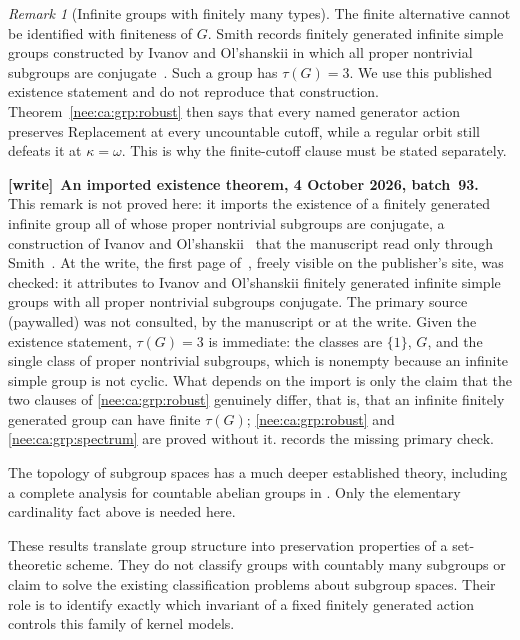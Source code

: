 \documentclass[11pt,letterpaper]{article}
\numberwithin{equation}{section}
\theoremstyle{plain}
\theoremstyle{definition}
\theoremstyle{remark}
\newtheorem{remark}[remark]{Remark}
\newenvironment{writenote}[1][]{\par\smallskip\begingroup\small\raggedright
 \setlength{\parindent}{1.25em}\noindent\textbf{[write]}\if\relax\detokenize{#1}\relax\else~\textbf{#1.}\fi\ }%
 {\par\endgroup\smallskip}
\begin{document}
\begin{remark}[Infinite groups with finitely many types]\label{nee:ca:grp:exception}
The finite alternative cannot be identified with finiteness of $G$.
Smith records finitely generated infinite simple groups constructed by
Ivanov and Ol'shanskii in which all proper nontrivial subgroups are
conjugate~\cite[p.~69]{Smith1995}.  Such a group has $\tau(G)=3$.
We use this published existence statement and do not reproduce that
construction.  Theorem~\ref{nee:ca:grp:robust} then says that every named
generator action preserves Replacement at every uncountable cutoff,
while a regular orbit still defeats it at $\kappa=\omega$.  This is why
the finite-cutoff clause must be stated separately.
\end{remark}

\begin{writenote}[An imported existence theorem, 4 October 2026, batch~93]
This remark is not proved here: it imports the existence of a finitely generated infinite group all of whose proper nontrivial subgroups are conjugate, a construction of Ivanov and Ol'shanskii~\cite{IO1991} that the manuscript read only through Smith~\cite{Smith1995}. At the write, the first page of~\cite{Smith1995}, freely visible on the publisher's site, was checked: it attributes to Ivanov and Ol'shanskii finitely generated infinite simple groups with all proper nontrivial subgroups conjugate. The primary source (paywalled) was not consulted, by the manuscript or at the write. Given the existence statement, $\tau(G)=3$ is immediate: the classes are $\{1\}$, $G$, and the single class of proper nontrivial subgroups, which is nonempty because an infinite simple group is not cyclic. What depends on the import is only the claim that the two clauses of \cref{nee:ca:grp:robust} genuinely differ, that is, that an infinite finitely generated group can have finite $\tau(G)$; \cref{nee:ca:grp:robust} and \cref{nee:ca:grp:spectrum} are proved without it.  records the missing primary check.
\end{writenote}

The topology of subgroup spaces has a much deeper established theory,
including a complete analysis for countable abelian groups in
\cite{CGP2010}. Only the elementary cardinality fact above is needed here.

These results translate group structure into preservation properties of
a set-theoretic scheme.  They do not classify groups with countably many
subgroups or claim to solve the existing classification problems about
subgroup spaces.  Their role is to identify exactly which invariant of
a fixed finitely generated action controls this family of kernel models.
\end{document}
